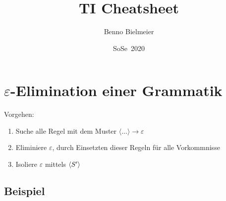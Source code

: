 \documentclass[a4paper,parskip=half,footsepline=on,headings=normal,titlepage=false]{scrartcl}
\title{\acl{TI} Cheatsheet}
\author{Benno Bielmeier }
\date{\ac{SoSe}~2020}
\newcommand{\nt}[1]{\langle \uppercase{#1} \rangle}
\renewcommand{\epsilon}{\varepsilon}
\begin{document}

\begin{acronym}
\end{acronym}

\maketitle
\tableofcontents

\section{\texorpdfstring{$\epsilon$}{Epsilon}-Elimination einer Grammatik}
Vorgehen:
\begin{enumerate}[label=\alph*)]
    \item Suche alle Regel mit dem Muster {\color{orange}$\langle \dots \rangle \to \epsilon$}
    \item {\color{green}Eliminiere $\epsilon$}, durch  Einsetzten dieser Regeln für alle Vorkommnisse
    \item {\color{blue}Isoliere $\epsilon$ mittels $\nt{S'}$}
\end{enumerate}

\subsection*{Beispiel}
\end{document}

